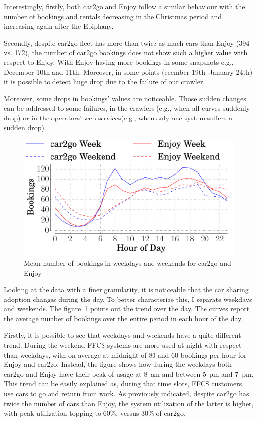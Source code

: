 Interestingly, firstly, both car2go and Enjoy follow a similar behaviour with the number of bookings and rentals decreasing in the Christmas period and increasing again after the Epiphany. 

Secondly, despite car2go fleet has more than twice as much cars than Enjoy (394 vs. 172), the number of car2go bookings does not show such a higher value with respect to Enjoy. With Enjoy having more bookings in some snapshots e.g., December 10th and 11th. Moreover, in some points (ecember 19th, January 24th) it is possible to detect huge drop due to the failure of our crawler. 

Moreover, some drops in bookings' values are noticeable. Those sudden changes can be addressed to some failures, in the crawlers (e.g., when all curves suddenly drop) or in the operators' web services(e.g., when only one system suffers a sudden drop).



\begin{figure}
\centering
 \includegraphics[width=0.85\columnwidth]{figures/bookings_day.pdf}
 \caption{Mean number of bookings in weekdays and weekends for car2go and Enjoy\label{fig:bookingsweek}}
\end{figure}

Looking at the data with a finer granularity, it is noticeable that the car sharing adoption changes during the day. To better characterize this, I separate weekdays and weekends. The figure~\ref{fig:bookingsweek} points out the trend over the day. The curves report the average number of bookings over the entire period  in each hour of the day.

Firstly, it is possible to see that weekdays and weekends have a quite different trend. During the weekend FFCS systems are more used at night with respect than weekdays, with on average at midnight of 80 and 60 bookings per hour for Enjoy and car2go. Instead, the figure shows how during the weekdays both car2go and Enjoy have their peak of usage at 8~am and between 5~pm and 7~pm. This trend can be easily explained as, during that time slots, FFCS customers use cars to go and return from work. 
As previously indicated, despite car2go has twice the number of cars than Enjoy, the system utilization of the latter is higher, with peak utilization topping to 60\%, versus 30\% of car2go. 

